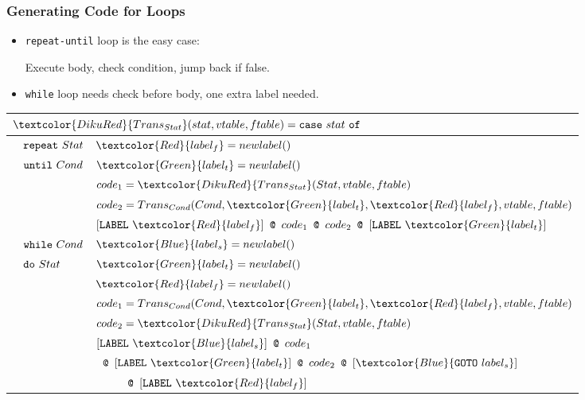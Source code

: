 \documentclass{beamer}
\newcommand{\codesize}{\footnotesize}
\newcommand{\cd}[1]{{{\codesize\tt #1}}}
\newcommand{\red}[1]{\textcolor{Red}{{#1}}}
\newcommand{\blue}[1]{\textcolor{Blue}{{#1}}}
\newcommand{\green}[1]{\textcolor{Green}{{#1}}}
\newcommand{\emp}[1]{\textcolor{DikuRed}{ #1}}
\begin{document}
\begin{frame}[fragile]
	\frametitle{Generating Code for Loops}

\begin{itemize}
\item \cd{repeat-until} loop is the easy case:

	Execute body, check condition, jump back if false.

\item \cd{while} loop needs check before body, one extra label needed.
\end{itemize}
\pause
{\footnotesize
\renewcommand{\arraystretch}{0.9}
\begin{tabular}{lll}%
\multicolumn{3}{l}{$ \emp{Trans_{Stat}}(stat,vtable,ftable)
 = \mbox{\tt case}~stat~\mbox{\tt of}$} \\\hline

&${\tt repeat}~Stat$
        & $\red{label_f} = newlabel()$ \\
&${\tt until}~Cond$
        & $\green{label_t} = newlabel()$ \\
&        & $code_1 = \emp{Trans_{Stat}}(Stat,vtable,ftable)$ \\
&        & $code_2 = Trans_{Cond}(Cond,\green{label_t},\red{label_f},vtable,ftable)$ \\
&        & $[{\tt LABEL}~\red{label_f}] \concat code_1 
		\concat code_2 \concat [{\tt LABEL}~\green{label_t}]$ \\\hline

&${\tt while}~Cond$
        & $\blue{label_s} = newlabel()$ \\
&${\tt do}~Stat$
        & $\green{label_t} = newlabel()$ \\
&        & $\red{label_f} = newlabel()$ \\
&        & $code_1 = Trans_{Cond}(Cond,\green{label_t},\red{label_f},vtable,ftable)$ \\
&        & $code_2 = \emp{Trans_{Stat}}(Stat,vtable,ftable)$ \\
&        & $ [{\tt LABEL}~\blue{label_s}] \concat code_1 $ \\
&        & $ \concat [{\tt LABEL}~\green{label_t}] \concat code_2 \concat [\blue{{\tt GOTO}~label_s}] $\\
&        & $~~~~~~~\concat [{\tt LABEL}~\red{label_f}] $\\\hline
\end{tabular}
}

\end{frame}
\end{document}
